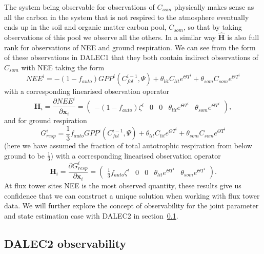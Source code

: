 \documentclass[11pt]{article}
\begin{document}
The system being observable for observations of $C_{som}$ physically makes sense as all the carbon in the system that is not respired to the atmosphere eventually ends up in the soil and organic matter carbon pool, $C_{som}$, so that by taking observations of this pool we observe all the others. In a similar way $\hat{\textbf{H}}$ is also full rank for observations of NEE and ground respiration. We can see from the form of these observations in DALEC1 that they both contain indirect observations of $C_{som}$ with NEE taking the form
\begin{equation}
NEE^{i}=-(1-f_{auto})GPP^{i}(C_{fol}^{i-1}, \Psi) + \theta_{lit}C_{lit} e^{\Theta T^{i}} + \theta_{som}C_{som} e^{\Theta T^{i}} \label{eqn: D1_nee}
\end{equation}
with a corresponding linearised observation operator
\begin{equation}
\textbf{H}_{i} = \frac{\partial NEE^{i}}{\partial \textbf{x}_{i}} =
\begin{pmatrix}
-(1-f_{auto})\zeta^i & 0 & 0 & \theta_{lit} e^{\Theta T^{i}} & \theta_{som} e^{\Theta T^{i}}
\end{pmatrix},
\end{equation}
and for ground respiration
\begin{equation}
G_{resp}^{i}=\frac{1}{3}f_{auto}GPP^{i}(C_{fol}^{i-1}, \Psi) + \theta_{lit}C_{lit} e^{\Theta T^{i}} + \theta_{som}C_{som} e^{\Theta T^{i}} \label{neeeqn}
\end{equation}
(here we have assumed the fraction of total autotrophic respiration from below ground to be $\frac{1}{3}$) with a corresponding linearised observation operator
\begin{equation}
\textbf{H}_{i} = \frac{\partial G_{resp}^{i}}{\partial \textbf{x}_{i}} =
\begin{pmatrix}
\frac{1}{3}f_{auto}\zeta^i & 0 & 0 & \theta_{lit} e^{\Theta T^{i}} & \theta_{som} e^{\Theta T^{i}}
\end{pmatrix}.
\end{equation}
At flux tower sites NEE is the most observed quantity, these results give us confidence that we can construct a unique solution when working with flux tower data. We will further explore the concept of observability for the joint parameter and state estimation case with DALEC2 in section~\ref{sec: D2_observability}. 

\FloatBarrier
\subsection{DALEC2 observability} \label{sec: D2_observability}
\end{document}
